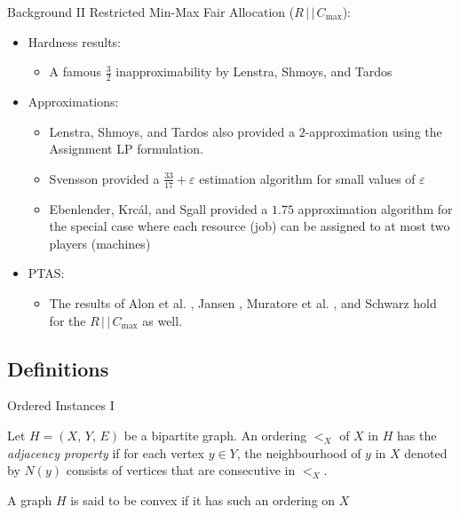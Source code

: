 \documentclass[10pt]{beamer}
\begin{document}
\begin{frame}{Background II}
	Restricted Min-Max Fair Allocation ($R \, | \, | \, C_{\max}$):
    \begin{itemize}
    	\item<2-> Hardness results:
        \begin{itemize}
        	\item<3-> A famous $\frac{3}{2}$ inapproximability by Lenstra, Shmoys, and Tardos \cite{LST90}
        \end{itemize}
        \item<4-> Approximations:
        \begin{itemize}
        	\item<5-> Lenstra, Shmoys, and Tardos also provided a $2$-approximation using the \alert{Assignment LP} formulation.
            \item<6-> Svensson provided a \alert{$\frac{33}{17} + \varepsilon$ estimation} algorithm for small values of $\varepsilon$ \cite{Svensson11}
            \item<7-> Ebenlender, Krc\'{a}l, and Sgall \cite{EKS08} provided a \alert{$1.75$} approximation algorithm for the special case where each resource (job) can be assigned to at most two players (machines)
        \end{itemize}
        \item<8-> PTAS:
        \begin{itemize}
            \item The results of Alon et al. \cite{AAWY98}, Jansen \cite{Jansen10}, Muratore et al. \cite{MSW10}, and Schwarz \cite{Schwarz10} hold for the $R \, | \, | \, C_{\max}$ as well.
        \end{itemize}
    \end{itemize}
\end{frame}

\subsection{Definitions}

\begin{frame}{Ordered Instances I}
	\begin{definition}
    	Let $H = (X, \, Y, \, E)$ be a bipartite graph. An ordering $<_X$ of $X$ in $H$ has the \emph{adjacency property} if for each vertex $y \in Y$, the neighbourhood of $y$ in $X$ denoted by $N(y)$ consists of vertices that are consecutive in $<_X$.	
	\end{definition}
    A graph $H$ is said to be \alert{convex} if it has such an ordering on $X$
\end{frame}
\end{document}
